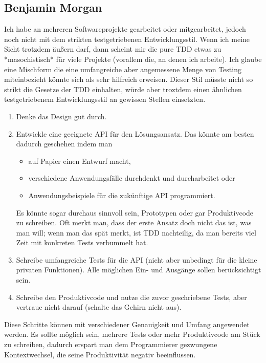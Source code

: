 \documentclass[a4paper,10pt]{scrartcl}
\newcommand{\bmn}{\marginpar{Benjamin\\Morgan}}
\begin{document}
\subsection{Benjamin Morgan}\label{Erfahrungsbericht Ben}\bmn
Ich habe an mehreren Softwareprojekte gearbeitet oder mitgearbeitet, jedoch
noch nicht mit dem strikten testgetriebenen Entwicklungsstil. Wenn ich meine
Sicht trotzdem äußern darf, dann scheint mir die pure TDD etwas zu
*masochistisch* für viele Projekte (vorallem die, an denen ich arbeite). Ich glaube
eine Mischform die eine umfangreiche aber angemessene Menge von Testing
miteinbezieht könnte sich als sehr hilfreich erweisen. Dieser Stil müsste
nicht so strikt die Gesetze der TDD einhalten, würde aber troztdem einen
ähnlichen testgetriebenem Entwicklungsstil an gewissen Stellen einsetzten.

\begin{enumerate}
    \item Denke das Design gut durch.
    \item Entwickle eine geeignete API für den Lösungsansatz. Das könnte am
        besten dadurch geschehen indem man
        \begin{itemize}
            \item auf Papier einen Entwurf macht,
            \item verschiedene Anwendungsfälle durchdenkt und durcharbeitet
                oder
            \item Anwendungsbeispiele für die zukünftige API programmiert.
        \end{itemize}
        Es könnte sogar durchaus sinnvoll sein, Prototypen oder gar
        Produktivcode zu schreiben. Oft merkt man, dass der erste Ansatz
        doch nicht das ist, was man will; wenn man das spät merkt, ist TDD
        nachteilig, da man bereits viel Zeit mit konkreten Tests verbummelt
        hat.
    \item Schreibe umfangreiche Tests für die API (nicht aber unbedingt für die
        kleine privaten Funktionen). Alle möglichen Ein- und Ausgänge sollen
        berücksichtigt sein.
    \item Schreibe den Produktivcode und nutze die zuvor geschriebene Tests,
        aber vertraue nicht darauf (schalte das Gehirn nicht aus).
\end{enumerate}

Diese Schritte können mit verschiedener Genauigkeit und Umfang angewendet
werden. Es sollte möglich sein, mehrere Tests oder mehr Produktivcode am
Stück zu schreiben, dadurch erspart man dem Programmierer gezwungene
Kontextwechsel, die seine Produktivität negativ beeinflussen.
\end{document}
